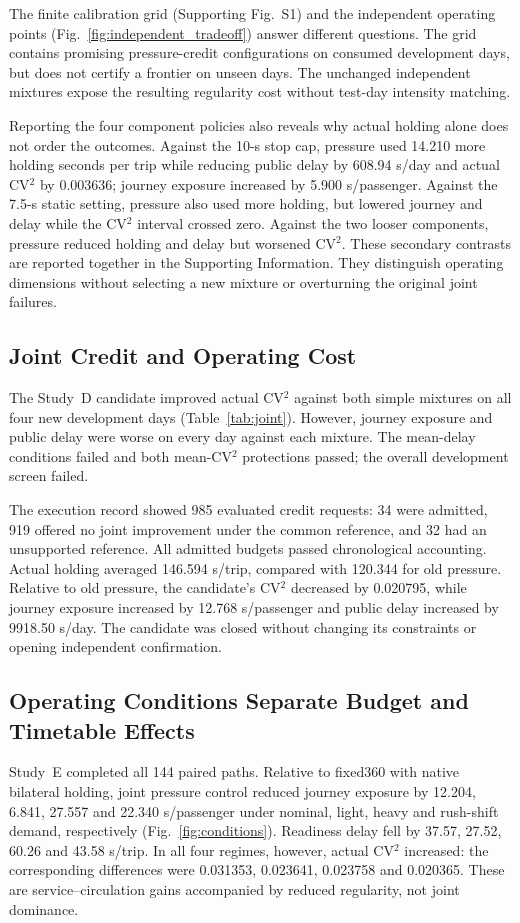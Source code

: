 The finite calibration grid (Supporting Fig.~S1) and the independent operating points (Fig.~\ref{fig:independent_tradeoff}) answer different questions. The grid contains promising pressure-credit configurations on consumed development days, but does not certify a frontier on unseen days. The unchanged independent mixtures expose the resulting regularity cost without test-day intensity matching.

Reporting the four component policies also reveals why actual holding alone does not order the outcomes. Against the 10-s stop cap, pressure used 14.210 more holding seconds per trip while reducing public delay by 608.94 s/day and actual CV$^2$ by 0.003636; journey exposure increased by 5.900 s/passenger. Against the 7.5-s static setting, pressure also used more holding, but lowered journey and delay while the CV$^2$ interval crossed zero. Against the two looser components, pressure reduced holding and delay but worsened CV$^2$. These secondary contrasts are reported together in the Supporting Information. They distinguish operating dimensions without selecting a new mixture or overturning the original joint failures.

\subsection{Joint Credit and Operating Cost}

The Study~D candidate improved actual CV$^2$ against both simple mixtures on all four new development days (Table~\ref{tab:joint}). However, journey exposure and public delay were worse on every day against each mixture. The mean-delay conditions failed and both mean-CV$^2$ protections passed; the overall development screen failed.

The execution record showed 985 evaluated credit requests: 34 were admitted, 919 offered no joint improvement under the common reference, and 32 had an unsupported reference. All admitted budgets passed chronological accounting. Actual holding averaged 146.594 s/trip, compared with 120.344 for old pressure. Relative to old pressure, the candidate's CV$^2$ decreased by 0.020795, while journey exposure increased by 12.768 s/passenger and public delay increased by 9918.50 s/day. The candidate was closed without changing its constraints or opening independent confirmation.

\subsection{Operating Conditions Separate Budget and Timetable Effects}

Study~E completed all 144 paired paths. Relative to fixed360 with native bilateral holding, joint pressure control reduced journey exposure by 12.204, 6.841, 27.557 and 22.340 s/passenger under nominal, light, heavy and rush-shift demand, respectively (Fig.~\ref{fig:conditions}). Readiness delay fell by 37.57, 27.52, 60.26 and 43.58 s/trip. In all four regimes, however, actual CV$^2$ increased: the corresponding differences were 0.031353, 0.023641, 0.023758 and 0.020365. These are service--circulation gains accompanied by reduced regularity, not joint dominance.


